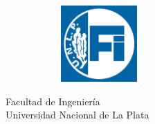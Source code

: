 \begin{titlepage}
\begin{center}
\begin{figure}[H]
\begin{subfigure}
                \end{subfigure}
                \begin{subfigure}
                    \centering
                    \includegraphics[width=0.32\textwidth]{Imagenes/FI Invertido.png}
                \end{subfigure}
            \end{figure}
            \vspace{1cm}
            \SemiBold
            Facultad de Ingeniería
            \\
            Universidad Nacional de La Plata
            \vspace{1cm}
        \end{center}
    \end{titlepage}